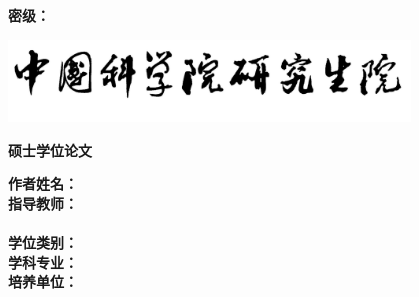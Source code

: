 
\thispagestyle{empty}
\begin{flushright}
    \sihao\songti\textbf{密级：\uline{\hspace{3.5em}}}
    \vspace{1.5cm}
\end{flushright}
\begin{center}
   \includegraphics[width=0.8\textwidth]{images/ioaname.pdf}
\end{center}
\vspace{1cm}
\centerline{\heiti\yihao\textbf{硕士学位论文}}

\vspace{1.5cm}

{\hspace{16mm}\songti\xiaoer\bfseries 
  \hspace{2mm} \begin{minipage}[t]{98mm}\linespread{1.1}\uline{\ioatitlec}\end{minipage}}

\vspace{2.5cm}

\begin{tabbing}
  \hspace{0mm}\songti\sihao\textbf{作者姓名：}\=\uline{\makebox[12cm]{\songti\sihao\bfseries\ioaauthornamec}}\\[2mm]
\hspace{0mm}\songti\sihao\textbf{指导教师：}\>\uline{\makebox[12cm]{\songti\sihao\bfseries\ioamentorf}}\\[2mm]
\hspace{29mm}                                 \>\uline{\makebox[12cm]{\songti\sihao\bfseries\ioamentors}}\\[2mm]
\hspace{0mm}\songti\sihao\textbf{学位类别：}\>\uline{\makebox[12cm]{\songti\sihao\bfseries\ioadegreec}}\\[2mm]
\hspace{0mm}\songti\sihao\textbf{学科专业：}\>\uline{\makebox[12cm]{\songti\sihao\bfseries\ioamajorc}}\\[2mm]
\hspace{0mm}\songti\sihao\textbf{培养单位：}\>\uline{\makebox[12cm]{\songti\sihao\bfseries\ioadepartmentc}}\\[2mm]
\end{tabbing}
\vspace{1cm}
\begin{center}
  \makebox{\songti\sihao\textbf{\ioadatec}}
\end{center}


